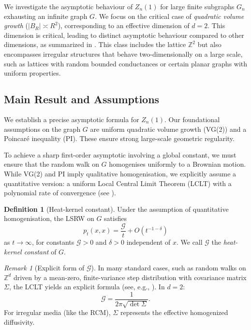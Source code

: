 \documentclass{article}
\numberwithin{equation}{section}
\theoremstyle{definition}
\newtheorem{definition}[theorem]{Definition}
\theoremstyle{remark}
\newtheorem{remark}[theorem]{Remark}
\newcommand{\cG}{\mathcal{G}}
\begin{document}
We investigate the asymptotic behaviour of $Z_n(1)$ for large finite subgraphs $G_n$ exhausting an infinite graph $G$. We focus on the critical case of \emph{quadratic volume growth} ($|B_R| \asymp R^2$), corresponding to an effective dimension of $d=2$. This dimension is critical, leading to distinct asymptotic behaviour compared to other dimensions, as summarized in . This class includes the lattice $\mathbb{Z}^2$ but also encompasses irregular structures that behave two-dimensionally on a large scale, such as lattices with random bounded conductances or certain planar graphs with uniform properties.

\subsection{Main Result and Assumptions}
We establish a precise asymptotic formula for $Z_n(1)$. Our foundational assumptions on the graph $G$ are uniform quadratic volume growth (VG(2)) and a Poincaré inequality (PI). These ensure strong large-scale geometric regularity.

To achieve a sharp first-order asymptotic involving a global constant, we must ensure that the random walk on $G$ homogenises uniformly to a Brownian motion. While VG(2) and PI imply qualitative homogenisation, we explicitly assume a quantitative version: a uniform Local Central Limit Theorem (LCLT) with a polynomial rate of convergence (see ).

\begin{definition}[Heat-kernel constant]\label{def:G}
Under the assumption of quantitative homogenisation, the LSRW on $G$ satisfies
\[
  p_t(x,x)=\frac{\cG}{t}+O(t^{-1-\delta})
\]
as $t\to\infty$, for constants $\cG>0$ and $\delta>0$ independent of $x$. We call $\cG$ the \emph{heat-kernel constant} of $G$.
\end{definition}

\begin{remark}[Explicit form of $\cG$]\label{rem:G_formula}
In many standard cases, such as random walks on $\mathbb{Z}^d$ driven by a mean-zero, finite-variance step distribution with covariance matrix $\Sigma$, the LCLT yields an explicit formula (see, e.g., \cite[Ch. 2]{LawlerLimic10}). In $d=2$:
\[
\cG = \frac{1}{2\pi\sqrt{\det\Sigma}}.
\]
For irregular media (like the RCM), $\Sigma$ represents the effective homogenized diffusivity.
\end{remark}
\end{document}
